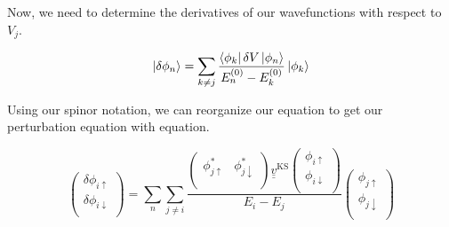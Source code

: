 \documentclass[10pt]{revtex4-1}
\newcommand{\ua}{\uparrow}
\newcommand{\da}{\downarrow}
\begin{document}
Now, we need to determine the derivatives of our wavefunctions with respect to $V_j$.

\begin{equation}
   \ket{\delta \phi_n} = \sum_{k \neq j} \frac{\bra{\phi_k} \delta V \ket{\phi_n}}{E_n^{(0)}-E_k^{(0)}} \ket{\phi_k}
\end{equation}

Using our spinor notation, we can reorganize our equation to get our perturbation equation with equation.

\begin{equation*}
  \begin{pmatrix}
    \delta \phi_{i \ua} \\
    \delta \phi_{i \da} \\
  \end{pmatrix}
  = \sum_n \sum_{j \neq i} \frac{
  \begin{pmatrix}
    \phi_{j \ua}^* & \phi_{j \da}^* \\
  \end{pmatrix}
  \underline{\underline{v}}^{\text{KS}}
  \begin{pmatrix}
    \phi_{i \ua} \\
    \phi_{i \da} \\
  \end{pmatrix}}
  {E_i - E_j}
  \begin{pmatrix}
    \phi_{j \ua} \\
    \phi_{j \da} \\
  \end{pmatrix}
\end{equation*}
\end{document}
